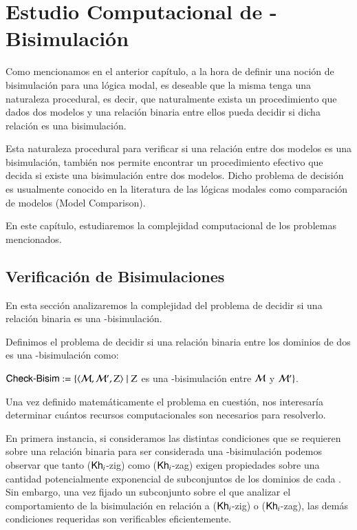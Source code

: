 \chapter{Estudio Computacional de \KHilogic-Bisimulación}

Como mencionamos en el anterior capítulo, a la hora de definir una noción de bisimulación para una lógica modal, 
es deseable que la misma tenga una naturaleza procedural, es decir, que naturalmente exista un procedimiento que dados dos
modelos y una relación binaria entre ellos pueda decidir si dicha relación es una bisimulación.

Esta naturaleza procedural para verificar si una relación entre dos modelos es una bisimulación,
también nos permite encontrar un procedimiento efectivo que decida si existe una bisimulación entre dos modelos. 
Dicho problema de decisión es usualmente conocido en la literatura de las lógicas modales como comparación de modelos (Model Comparison).

En este capítulo, estudiaremos la complejidad computacional de los problemas mencionados.

\section{Verificación de Bisimulaciones}

En esta sección analizaremos la complejidad del problema de decidir si una relación binaria es una \KHilogic-bisimulación.  

\begin{definicion}
    Definimos el problema de decidir si una relación binaria entre los dominios de dos \ults es una \KHilogic-bisimulación como:
    \begin{center}
        $\rm\textsf{Check-Bisim} := \{\langle \mathcal{M},\mathcal{M}',Z \rangle \mid Z$ es una \KHilogic-bisimulación entre $\mathcal{M}$ y $\mathcal{M}'\}$.
    \end{center}
\end{definicion}

Una vez definido matemáticamente el problema en cuestión, nos interesaría determinar cuántos recursos computacionales son necesarios 
para resolverlo.

En primera instancia, si consideramos las distintas condiciones que se requieren sobre una relación binaria para ser considerada una 
\KHilogic-bisimulación podemos observar que tanto ($\mathsf{Kh}_i$-zig) como ($\mathsf{Kh}_i$-zag) exigen propiedades sobre una cantidad potencialmente 
exponencial de subconjuntos de los dominios de cada \ults. Sin embargo, una vez fijado un subconjunto sobre el que analizar el  
comportamiento de la bisimulación en relación a ($\mathsf{Kh}_i$-zig) o ($\mathsf{Kh}_i$-zag), las demás condiciones requeridas son verificables 
eficientemente. 

